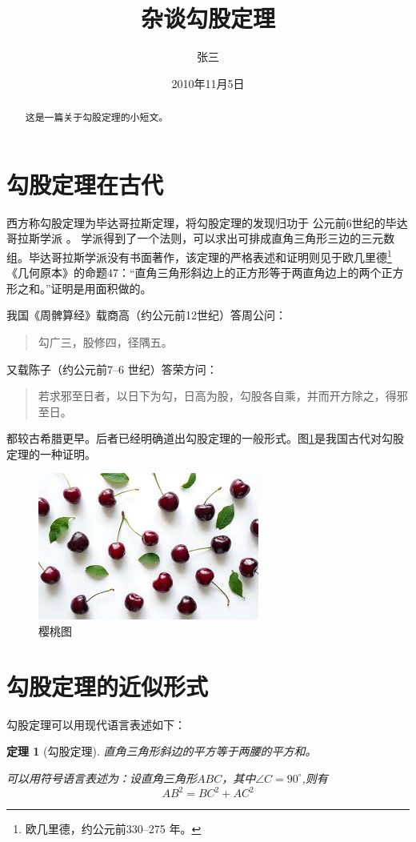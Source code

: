 \documentclass[UTF8]{ctexart}
\title{\heiti 杂谈勾股定理}
\author{\kaishu 张三}
\date{\kaishu 2010年11月5日}
\newtheorem{thm}{定理}
\newenvironment{myquote}{\begin{quote} \kaishu\zihao{-5}}{\end{quote}}
\newcommand{\degree}{^\circ}
\begin{document}
\maketitle
\begin{abstract}
这是一篇关于勾股定理的小短文。
\end{abstract}
\tableofcontents
\section{勾股定理在古代}
\label{sec:first}
西方称勾股定理为毕达哥拉斯定理，将勾股定理的发现归功于
公元前6世纪的毕达哥拉斯学派\cite{Kline} 。
学派得到了一个法则，可以求出可排成直角三角形三边的三元数组。毕达哥拉斯学派没有书面著作，该定理的严格表述和证明则见于欧几里德\footnote{欧几里德，约公元前330--275 年。}《几何原本》的命题47：“直角三角形斜边上的正方形等于两直角边上的两个正方形之和。”证明是用面积做的。

我国《周髀算经》载商高（约公元前12世纪）答周公问：
\begin{myquote}
勾广三，股修四，径隅五。
\end{myquote}
又载陈子（约公元前7--6 世纪）答荣方问：
\begin{myquote}
若求邪至日者，以日下为勾，日高为股，勾股各自乘，并而开方除之，得邪至日。
\end{myquote}
都较古希腊更早。后者已经明确道出勾股定理的一般形式。图\ref{fig:cherry}是我国古代对勾股
定理的一种证明\cite{quanjing}。
\begin{figure}[ht]
\centering
\includegraphics[scale=0.8]{images.jpg}
\caption{樱桃图}
\label{fig:cherry}  
\end{figure}
\section{勾股定理的近似形式}
勾股定理可以用现代语言表述如下：
\begin{thm}[勾股定理]
直角三角形斜边的平方等于两腰的平方和。

可以用符号语言表述为：设直角三角形$ABC$，其中$\angle C=90\degree$,则有
\begin{equation}
\label{eq:gougu}
AB^2 = BC^2 + AC^2
\end{equation}
\end{thm}
\end{document}
